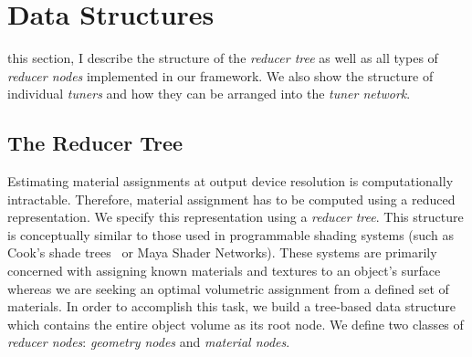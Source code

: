 \chapter{Data Structures}
\label{chap:struct}
 this section, I describe the structure of the \emph{reducer tree} as well as all types of \emph{reducer nodes} implemented in our framework. We also show the structure of individual \emph{tuners} and how they can be arranged into the \emph{tuner network}.

\section{The Reducer Tree}
 Estimating material assignments at output device resolution is computationally intractable. Therefore, material assignment has to be computed using a reduced representation. We specify this representation using a \emph{reducer tree}. This structure is conceptually similar to those used in programmable shading systems (such as Cook's shade trees~ or Maya Shader Networks). These systems are primarily concerned with assigning known materials and textures to an object's surface whereas we are seeking an optimal volumetric assignment from a defined set of materials. In order to accomplish this task, we build a tree-based data structure which contains the entire object volume as its root node. We define two classes of \emph{reducer nodes}: \emph{geometry nodes} and \emph{material nodes}.

